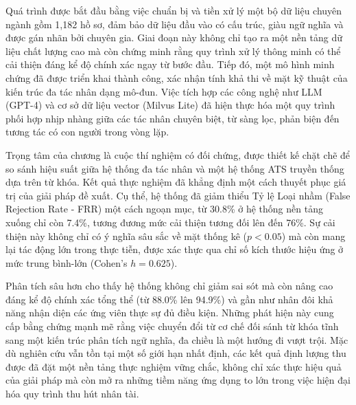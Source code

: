 \documentclass{article}
\begin{document}
\begin{itemize}[topsep=0pt, itemsep=4pt, leftmargin=40pt]
Quá trình được bắt đầu bằng việc chuẩn bị và tiền xử lý một bộ dữ liệu chuyên ngành gồm 1,182 hồ sơ, đảm bảo dữ liệu đầu vào có cấu trúc, giàu ngữ nghĩa và được gán nhãn bởi chuyên gia. Giai đoạn này không chỉ tạo ra một nền tảng dữ liệu chất lượng cao mà còn chứng minh rằng quy trình xử lý thông minh có thể cải thiện đáng kể độ chính xác ngay từ bước đầu. Tiếp đó, một mô hình minh chứng đã được triển khai thành công, xác nhận tính khả thi về mặt kỹ thuật của kiến trúc đa tác nhân dạng mô-đun. Việc tích hợp các công nghệ như LLM (GPT-4) và cơ sở dữ liệu vector (Milvus Lite) đã hiện thực hóa một quy trình phối hợp nhịp nhàng giữa các tác nhân chuyên biệt, từ sàng lọc, phản biện đến tương tác có con người trong vòng lặp.

Trọng tâm của chương là cuộc thí nghiệm có đối chứng, được thiết kế chặt chẽ để so sánh hiệu suất giữa hệ thống đa tác nhân và một hệ thống ATS truyền thống dựa trên từ khóa. Kết quả thực nghiệm đã khẳng định một cách thuyết phục giá trị của giải pháp đề xuất. Cụ thể, hệ thống đã giảm thiểu Tỷ lệ Loại nhầm (False Rejection Rate - FRR) một cách ngoạn mục, từ 30.8\% ở hệ thống nền tảng xuống chỉ còn 7.4\%, tương đương mức cải thiện tương đối lên đến 76\%. Sự cải thiện này không chỉ có ý nghĩa sâu sắc về mặt thống kê ($p<0.05$) mà còn mang lại tác động lớn trong thực tiễn, được xác thực qua chỉ số kích thước hiệu ứng ở mức trung bình-lớn (Cohen's $h=0.625$).

Phân tích sâu hơn cho thấy hệ thống không chỉ giảm sai sót mà còn nâng cao đáng kể độ chính xác tổng thể (từ 88.0\% lên 94.9\%) và gần như nhân đôi khả năng nhận diện các ứng viên thực sự đủ điều kiện. Những phát hiện này cung cấp bằng chứng mạnh mẽ rằng việc chuyển đổi từ cơ chế đối sánh từ khóa tĩnh sang một kiến trúc phân tích ngữ nghĩa, đa chiều là một hướng đi vượt trội. Mặc dù nghiên cứu vẫn tồn tại một số giới hạn nhất định, các kết quả định lượng thu được đã đặt một nền tảng thực nghiệm vững chắc, không chỉ xác thực hiệu quả của giải pháp mà còn mở ra những tiềm năng ứng dụng to lớn trong việc hiện đại hóa quy trình thu hút nhân tài.

\newpage
{}
\titlespacing{\section}{0pt}{0pt}{30pt} %
\titleformat{\section}{\centering\fontsize{28pt}{8pt}\bfseries}{}{0pt}{%
    {}%
    {}%
}

\end{itemize}
\end{document}
